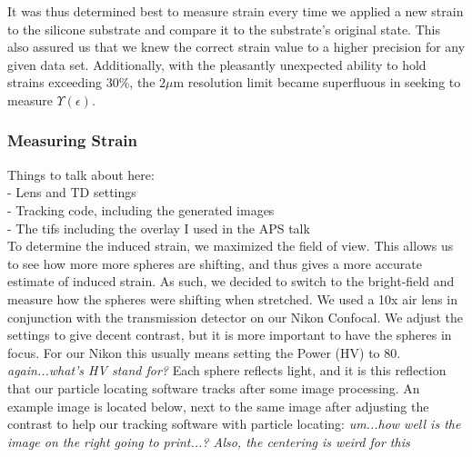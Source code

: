  It was thus determined best to measure strain every time we applied a new strain to the silicone substrate and compare it to the substrate's original state. This also assured us that we knew the correct strain value to a higher precision for any given data set. Additionally, with the pleasantly unexpected ability to hold strains exceeding 30\%, the $2\mu$m resolution  limit became superfluous in seeking to measure $\Upsilon(\epsilon)$.
 
\subsubsection{Measuring Strain}
Things to talk about here:\\
- Lens and TD settings \checkmark \\
- Tracking code, including the generated images \\
- The tifs including the overlay I used in the APS talk \\

To determine the induced strain, we maximized the field of view. This allows us to see how more more spheres are shifting, and thus gives a more accurate estimate of induced strain. As such, we decided to switch to the bright-field and measure how the spheres were shifting when stretched. We used a 10x air lens in conjunction with the transmission detector on our Nikon Confocal. We adjust the settings to give decent contrast, but it is more important to have the spheres in focus. For our Nikon this usually means setting the Power (HV) to 80. \emph{again...what's HV stand for?} Each sphere reflects light, and it is this reflection that our particle locating software tracks after some image processing. An example image is located below, next to the same image after adjusting the contrast to help our tracking software with particle locating: \emph{um...how well is the image on the right going to print...? Also, the centering is weird for this}

